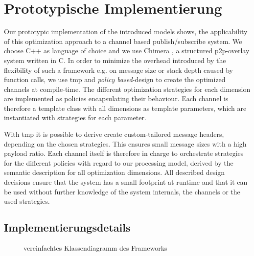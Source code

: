 \chapter{Prototypische Implementierung}
\label{chap:impl}

Our prototypic implementation of the introduced models shows, the applicability of this optimization approach to a channel based publish/subscribe system. We choose C++ as language of choice and we use Chimera \cite{Allen2006Chimera}, a structured p2p-overlay system written in C. In order to minimize the overhead introduced by the flexibility of such a framework e.g. on message size or stack depth caused by function calls, we use \ac{tmp} and \emph{policy based}-design \cite{Alexandrescu2001Modern} to create the optimized channels at compile-time. The different optimization strategies for each dimension are implemented as policies encapsulating their behaviour. Each channel is therefore a template class with all dimensions as template parameters, which are instantiated with strategies for each parameter.  

With \ac{tmp} it is possible to derive create custom-tailored message headers, depending on the chosen strategies. This ensures small message sizes with a high payload ratio. Each channel itself is therefore in charge to orchestrate strategies for the different policies with regard to our processing model, derived by the semantic description for all optimization dimensions. All described design decisions ensure that the system has a small footprint at runtime and that it can be used without further knowledge of the system internals, the channels or the used strategies.



\section{Implementierungsdetails}

\begin{figure}[htbp]
\centering
{}
\caption{vereinfachtes Klassendiagramm des Frameworks}
\label{fig:uml}
\end{figure}

